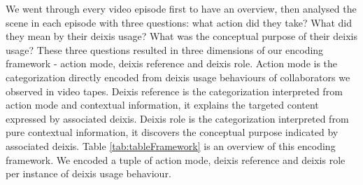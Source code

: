 \documentclass[12pt,twoside]{article}
\begin{document}
We went through every video episode first to have an overview, then analysed the scene in each episode with three questions: what action did they take? What did they mean by their deixis usage? What was the conceptual purpose of their deixis usage? These three questions resulted in three dimensions of our encoding framework - action mode, deixis reference and deixis role. Action mode is the categorization directly encoded from deixis usage behaviours of collaborators we observed in video tapes. Deixis reference is the categorization interpreted from action mode and contextual information, it explains the targeted content expressed by associated deixis. Deixis role is the categorization interpreted from pure contextual information, it discovers the conceptual purpose indicated by associated deixis. Table \ref{tab:tableFramework} is an overview of this encoding framework. We encoded a tuple of action mode, deixis reference and deixis role per instance of deixis usage behaviour.
\end{document}
